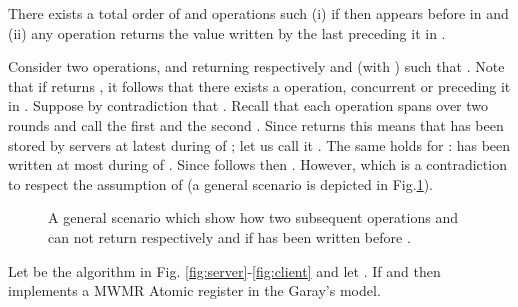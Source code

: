 \begin{theorem}[Ordering]\label{t:ordering} There exists a total order  of  and  operations such (i) if  then  appears before  in  and (ii) any  operation returns the value  written by the last  preceding it in .
\end{theorem}

\begin{proofL}
	Consider two  operations,  and  returning respectively  and  (with ) such that .
	Note that if  returns , it follows that there exists a  operation,   concurrent or preceding it in . 
	Suppose by contradiction that . Recall that each  operation spans over two rounds and call the first  and the second .
Since  returns  this means that  has been stored by servers at latest during  of ; let us call it . The same holds for :  has been written at most during  of . 
	Since  follows  then . However, which is a contradiction to respect the assumption of  (a general scenario is depicted in Fig.\ref{fig:scenarioOrdering}).
	\renewcommand{\toto}{t:ordering}
\end{proofL}


\begin{figure}
	\caption{A general scenario which show how two subsequent  operations  and  can not return respectively  and  if  has been written before .}
	\label{fig:scenarioOrdering}
\end{figure}

\begin{theorem}\label{th:Garay}
	Let  be the algorithm in Fig. \ref{fig:server}-\ref{fig:client} and let .
	If  and  then  implements a MWMR Atomic register in the Garay's model.
	
\end{theorem}

